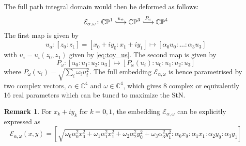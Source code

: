 \documentclass[a4paper,11pt]{article}
\theoremstyle{definition}
\newtheorem{remark}{Remark}
\newcommand{\hooklongrightarrow}{\lhook\joinrel\longrightarrow}
\newcommand{\CC}{\mathbb{C}}
\newcommand{\CP}{\mathbb{CP}}
\newcommand{\EE}{\mathcal{E}}
\begin{document}
The full path integral domain would then be deformed as follows:
\begin{equation}
  \EE_{\alpha,\omega} \colon \CP^1  \stackrel{u_{\alpha}}{\hooklongrightarrow}  \CP^3  \stackrel{P_{\omega}}{\hooklongrightarrow}  \CP^4
  \label{eq:toy_E}
\end{equation}
The first map is given by 
\begin{equation} 
  u_{\alpha} \colon [z_0:z_1] = [x_0 + i y_0:x_1 + i y_1] \mapsto [\alpha_0 u_0 : \dots : \alpha_3 u_3 ]
  \label{eq:toy_cont_deform1}
\end{equation}
with $u_i = u_i(z_0,z_1)$ given by \eqref{eq:toy_us}.
The second map is given by 
\begin{equation}
  P_{\omega} \colon [u_0:u_1:u_2:u_3] \mapsto [P_{\omega}(u_i):u_0:u_1:u_2:u_3]
\end{equation}
where $P_{\omega}(u_i) = \sqrt{\sum_i \omega_i u_i^2}$.
The full embedding $\EE_{\alpha,\omega}$ is hence parametrised by two complex vectors, $\alpha \in \CC^4$ and $\omega \in \CC^4$, which gives 8 complex or equivalently 16 real parameters which can be tuned to maximize the StN.

\begin{remark}
For $x_k + i y_k$ for $k=0,1$, the embedding $\EE_{\alpha,\omega}$ can be explicitly expressed as 
\begin{equation}
  \EE_{\alpha,\omega}(x,y) = [\sqrt{\omega_0 \alpha_0^2 x_0^2 + \omega_1 \alpha_1^2 x_1^2 + \omega_2 \alpha_2^2 y_0^2 + \omega_3 \alpha_3^2 y_1^2 }: \alpha_0 x_0 : \alpha_1 x_1: \alpha_2 y_0 : \alpha_3 y_1]
\end{equation}
\end{remark}
\end{document}
